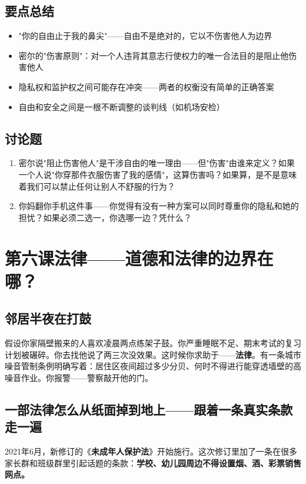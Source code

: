 \documentclass[a4paper,12pt]{ctexart}
\begin{document}
\subsection*{要点总结}
\begin{itemize}
  \item "你的自由止于我的鼻尖"——自由不是绝对的，它以不伤害他人为边界
  \item 密尔的"伤害原则"：对一个人违背其意志行使权力的唯一合法目的是阻止他伤害他人
  \item 隐私权和监护权之间可能存在冲突——两者的权衡没有简单的正确答案
  \item 自由和安全之间是一根不断调整的谈判线（如机场安检）
\end{itemize}

\subsection*{讨论题}
\begin{enumerate}
  \item 密尔说"阻止伤害他人"是干涉自由的唯一理由——但"伤害"由谁来定义？如果一个人说"你穿那件衣服伤害了我的感情"，这算伤害吗？如果算，是不是意味着我们可以禁止任何让别人不舒服的行为？
  \item 你妈翻你手机这件事——你觉得有没有一种方案可以同时尊重你的隐私和她的担忧？如果必须二选一，你选哪一边？凭什么？
\end{enumerate}

\newpage
\section{\textcolor{orange!80!black}{第六课\quad 法律——道德和法律的边界在哪？}}

\subsection*{邻居半夜在打鼓}

假设你家隔壁搬来的人喜欢凌晨两点练架子鼓。你严重睡眠不足、期末考试的复习计划被碾碎。你去找他说了两三次没效果。这时候你求助于——\textbf{法律}。有一条城市噪音管制条例明确写着：居住区夜间超过多少分贝、何时不得进行能穿透墙壁的高噪音作业。你报警——警察敲开他的门。

\subsection*{一部法律怎么从纸面掉到地上——跟着一条真实条款走一遍}

2021年6月，新修订的《\textbf{未成年人保护法}》开始施行。这次修订里加了一条在很多家长群和班级群里引起话题的条款：\textbf{学校、幼儿园周边不得设置烟、酒、彩票销售网点。}
\end{document}
